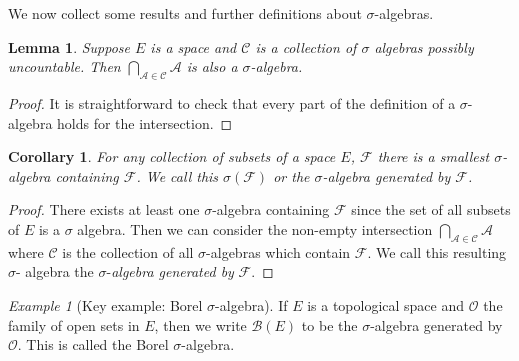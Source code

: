 \documentclass[11pt]{article}
\newtheorem{cor}[thm]{Corollary}
\newtheorem{lem}[thm]{Lemma}
\theoremstyle{definition}
\theoremstyle{remark}
\newtheorem{ex}[thm]{Example}
\begin{document}
We now collect some results and further definitions about $\sigma$-algebras.
\begin{lem}
Suppose $E$ is a space and $\mathcal{C}$ is a collection of $\sigma$ algebras possibly uncountable. Then $\bigcap_{\mathcal{A} \in \mathcal{C}} \mathcal{A}$ is also a $\sigma$-algebra.
\end{lem}
\begin{proof}
It is straightforward to check that every part of the definition of a $\sigma$-algebra holds for the intersection.
\end{proof}
\begin{cor}
For any collection of subsets of a space $E$, $\mathcal{F}$ there is a smallest $\sigma$-algebra containing $\mathscr{F}$. We call this $\sigma(\mathcal{F})$ or the $\sigma$-algebra generated by $\mathcal{F}$.
\end{cor}
\begin{proof}
There exists at least one $\sigma$-algebra containing $\mathcal{F}$ since the set of all subsets of $E$ is a $\sigma$ algebra. Then we can consider the non-empty intersection $\bigcap_{\mathcal{A} \in \mathcal{C}} \mathcal{A}$ where $\mathcal{C}$ is the collection of all $\sigma$-algebras which contain $\mathcal{F}$. We call this resulting $\sigma$- algebra the $\sigma$-\emph{algebra generated by} $\mathcal{F}$.
\end{proof}

\begin{ex}[Key example: Borel $\sigma$-algebra]
If $E$ is a topological space and $\mathcal{O}$ the family of open sets in $E$, then we write $\mathcal{B}(E)$ to be the $\sigma$-algebra generated by $\mathcal{O}$. This is called the Borel $\sigma$-algebra.
\end{ex}
\end{document}
